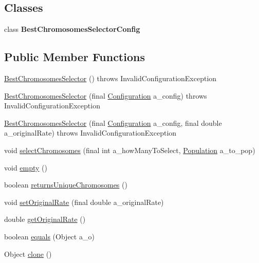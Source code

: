 \subsection*{Classes}
\begin{DoxyCompactItemize}
\item 
class {\bfseries Best\-Chromosomes\-Selector\-Config}
\end{DoxyCompactItemize}
\subsection*{Public Member Functions}
\begin{DoxyCompactItemize}
\item 
\hyperlink{classorg_1_1jgap_1_1impl_1_1_best_chromosomes_selector_a3ea96e0ab01abd0a12f324fd484e82b4}{Best\-Chromosomes\-Selector} ()  throws Invalid\-Configuration\-Exception 
\item 
\hyperlink{classorg_1_1jgap_1_1impl_1_1_best_chromosomes_selector_a7f758fb893bf4d7270cdd587251063a2}{Best\-Chromosomes\-Selector} (final \hyperlink{classorg_1_1jgap_1_1_configuration}{Configuration} a\-\_\-config)  throws Invalid\-Configuration\-Exception 
\item 
\hyperlink{classorg_1_1jgap_1_1impl_1_1_best_chromosomes_selector_ae2ea64513693e0beb2cc713daf56ffc5}{Best\-Chromosomes\-Selector} (final \hyperlink{classorg_1_1jgap_1_1_configuration}{Configuration} a\-\_\-config, final double a\-\_\-original\-Rate)  throws Invalid\-Configuration\-Exception 
\item 
void \hyperlink{classorg_1_1jgap_1_1impl_1_1_best_chromosomes_selector_afa8c26dbb642fa1809cd89cb9b7e0d43}{select\-Chromosomes} (final int a\-\_\-how\-Many\-To\-Select, \hyperlink{classorg_1_1jgap_1_1_population}{Population} a\-\_\-to\-\_\-pop)
\item 
void \hyperlink{classorg_1_1jgap_1_1impl_1_1_best_chromosomes_selector_a807b0148412ef68d5a5d4b660a515f80}{empty} ()
\item 
boolean \hyperlink{classorg_1_1jgap_1_1impl_1_1_best_chromosomes_selector_ac1b16641fb070ed5039193e4f081d809}{returns\-Unique\-Chromosomes} ()
\item 
void \hyperlink{classorg_1_1jgap_1_1impl_1_1_best_chromosomes_selector_aba1bf0b64c8a0515a958ee6eced6f78d}{set\-Original\-Rate} (final double a\-\_\-original\-Rate)
\item 
double \hyperlink{classorg_1_1jgap_1_1impl_1_1_best_chromosomes_selector_ac06f03890f0fa7e11109ae8bce3a25fe}{get\-Original\-Rate} ()
\item 
boolean \hyperlink{classorg_1_1jgap_1_1impl_1_1_best_chromosomes_selector_ac75ef274bef9371aa93d5b370061f8d8}{equals} (Object a\-\_\-o)
\item 
Object \hyperlink{classorg_1_1jgap_1_1impl_1_1_best_chromosomes_selector_a5853ec606d4404adc52c906857fee0c5}{clone} ()
\end{DoxyCompactItemize}

